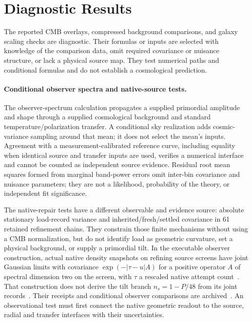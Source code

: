 \documentclass[11pt]{article}
\begin{document}
\section{Diagnostic Results}

The reported CMB overlays, compressed background comparisons, and galaxy
scaling checks are diagnostic. Their formulas or inputs are selected with knowledge of
the comparison data, omit required covariance or nuisance structure, or lack a
physical source map. They test numerical paths and conditional formulas and
do not establish a cosmological prediction.

\paragraph{Conditional observer spectra and native-source tests.}
The observer-spectrum calculation propagates a supplied primordial
amplitude and shape through a supplied cosmological background and standard
temperature/polarization transfer. A conditional sky realization adds
cosmic-variance sampling around that mean; it does not select the mean's
inputs. Agreement with a measurement-calibrated reference curve, including
equality when identical source and transfer inputs are used, verifies a
numerical interface and cannot be counted as independent source evidence.
Residual root mean squares formed from marginal band-power errors omit
inter-bin covariance and nuisance parameters; they are not a likelihood,
probability of the theory, or independent fit significance.

The native-repair tests have a different observable and evidence source:
absolute stationary load-record variance and inherited/fresh/settled
covariance in 61 retained refinement chains. They constrain those finite
mechanisms without using a CMB normalization, but do not identify load as
geometric curvature, set a physical background, or supply a primordial
tilt. In the executable observer construction, actual native density
snapshots on refining source screens have joint Gaussian limits with
covariance \(\exp(-|\tau-u|A)\) for a positive operator \(A\) of spectral
dimension two on the screen, with \(\tau\) a rescaled native attempt
count~\cite{ophtimefields,ophcontinuum}. That construction does not derive
the tilt branch \(n_s=1-P/48\) from its joint records~\cite{ophpublicdata}.
Their receipts and conditional observer comparisons are
archived~\cite{ophobsdyn}.
An observational test must first connect the native geometric readout to
the source, radial and transfer interfaces with their uncertainties.
\end{document}
